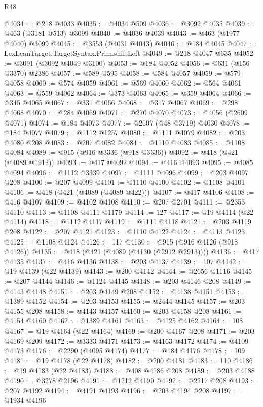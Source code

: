 \begin{lexlean}{R48}
\begin{coremodule}
@4034 := @218 @4033
@4035 := @4034 @509
@4036 := @3092 @4035
@4039 := @463 (@3181 @513) @3099
@4040 := @4036 @4039
@4043 := @463 (@1977 @4040) @3099
@4045 := @3553 (@4031 @4043)
@4046 := @184 @4045
@4047 := LexLeanTarget.TargetSyntax.Prim.shiftLeft
@4049 := @218 @4047 @635
@4052 := @3091 (@3092 @4049 @3100)
@4053 := @184 @4052
@4056 := @631 (@156 @3370) @2386
@4057 := @589 @595
@4058 := @584 @4057
@4059 := @579 @4058
@4060 := @574 @4059
@4061 := @569 @4060
@4062 := @564 @4061
@4063 := @559 @4062
@4064 := @373 @4063
@4065 := @359 @4064
@4066 := @345 @4065
@4067 := @331 @4066
@4068 := @317 @4067
@4069 := @298 @4068
@4070 := @284 @4069
@4071 := @270 @4070
@4073 := @4056 (@2609 @4071)
@4074 := @184 @4073
@4077 := @2607 (@48 @3719) @4030
@4078 := @184 @4077
@4079 := @1112 @1257
@4080 := @1111 @4079
@4082 := @203 @4080 @208
@4083 := @207 @4082
@4084 := @1110 @4083
@4085 := @1108 @4084
@4089 := @915 (@916 @3336 (@918 @3336))
@4092 := @418 (@421 (@4089 @1912))
@4093 := @417 @4092
@4094 := @416 @4093
@4095 := @4085 @4094
@4096 := @1112 @3339
@4097 := @1111 @4096
@4099 := @203 @4097 @208
@4100 := @207 @4099
@4101 := @1110 @4100
@4102 := @1108 @4101
@4106 := @418 (@421 (@4089 (@4089 @422)))
@4107 := @417 @4106
@4108 := @416 @4107
@4109 := @4102 @4108
@4110 := @207 @2701
@4111 := @2353 @4110
@4113 := @1108 @4111 @1179
@4114 := 127
@4117 := @19 @4114 (@22 @4114)
@4118 := @1112 @4117
@4119 := @1111 @4118
@4121 := @203 @4119 @208
@4122 := @207 @4121
@4123 := @1110 @4122
@4124 := @4113 @4123
@4125 := @1108 @4124
@4126 := 117
@4130 := @915 (@916 @4126 (@918 @4126))
@4135 := @418 (@421 (@4089 (@4130 (@2912 @2913))))
@4136 := @417 @4135
@4137 := @416 @4136
@4138 := @203 @4137
@4139 := 107
@4142 := @19 @4139 (@22 @4139)
@4143 := @200 @4142
@4144 := @2656 @1116
@4145 := @207 @4144
@4146 := @1124 @4145
@4148 := @203 @4146 @208
@4149 := @4143 @4148
@4151 := @203 @4149 @208
@4152 := @4138 @4151
@4153 := @1389 @4152
@4154 := @203 @4153
@4155 := @2444 @4145
@4157 := @203 @4155 @208
@4158 := @4143 @4157
@4160 := @203 @4158 @208
@4161 := @4154 @4160
@4162 := @1389 @4161
@4163 := @4125 @4162
@4164 := 108
@4167 := @19 @4164 (@22 @4164)
@4169 := @200 @4167 @208
@4171 := @203 @4169 @209
@4172 := @3333 @4171
@4173 := @4163 @4172
@4174 := @4109 @4173
@4176 := @2290 (@4095 @4174)
@4177 := @184 @4176
@4178 := 109
@4181 := @19 @4178 (@22 @4178)
@4182 := @200 @4181
@4183 := 110
@4186 := @19 @4183 (@22 @4183)
@4188 := @408 @4186 @208
@4189 := @203 @4188
@4190 := @3278 @2196
@4191 := @1212 @4190
@4192 := @2217 @208
@4193 := @207 @4192
@4194 := @4191 @4193
@4196 := @203 @4194 @208
@4197 := @1934 @4196

\end{coremodule}
\end{lexlean}
